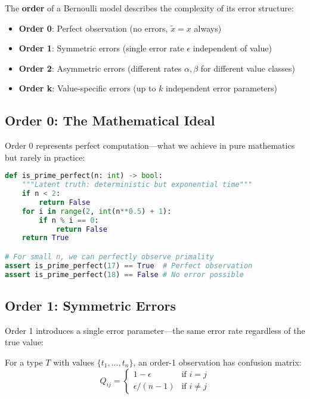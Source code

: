 \begin{definition}
The \textbf{order} of a Bernoulli model describes the complexity of its error structure:
\begin{itemize}
\item \textbf{Order 0}: Perfect observation (no errors, $\tilde{x} = x$ always)
\item \textbf{Order 1}: Symmetric errors (single error rate $\epsilon$ independent of value)
\item \textbf{Order 2}: Asymmetric errors (different rates $\alpha, \beta$ for different value classes)
\item \textbf{Order k}: Value-specific errors (up to $k$ independent error parameters)
\end{itemize}
\end{definition}

\subsection{Order 0: The Mathematical Ideal}

Order 0 represents perfect computation—what we achieve in pure mathematics but rarely in practice:

\begin{lstlisting}[language=Python, caption={Order 0: Perfect observation (impractical for large inputs)}]
def is_prime_perfect(n: int) -> bool:
    """Latent truth: deterministic but exponential time"""
    if n < 2:
        return False
    for i in range(2, int(n**0.5) + 1):
        if n % i == 0:
            return False
    return True

# For small n, we can perfectly observe primality
assert is_prime_perfect(17) == True  # Perfect observation
assert is_prime_perfect(18) == False # No error possible
\end{lstlisting}

\subsection{Order 1: Symmetric Errors}

Order 1 introduces a single error parameter—the same error rate regardless of the true value:

\begin{definition}
For a type $T$ with values $\{t_1, ..., t_n\}$, an order-1 observation has confusion matrix:
\begin{equation}
Q_{ij} = \begin{cases}
1 - \epsilon & \text{if } i = j \\
\epsilon/(n-1) & \text{if } i \neq j
\end{cases}
\end{equation}
\end{definition}

